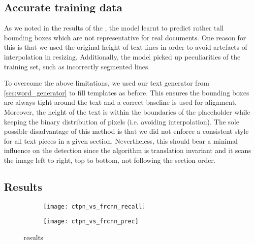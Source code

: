 



	\subsection{Accurate training data}
		As we noted in the results of the \FRCNN{}, the model learnt to predict rather tall bounding boxes which are not representative for real documents. One reason for this is that we used the original height of text lines in order to avoid artefacts of interpolation in resizing. Additionally, the model picked up peculiarities of the training set, such as incorrectly segmented lines.

		To overcome the above limitations, we used our text generator from \autoref{sec:word_generator} to fill templates as before. This ensures the bounding boxes are always tight around the text and a correct baseline is used for alignment. Moreover, the height of the text is within the boundaries of the placeholder while keeping the binary distribution of pixels (i.e. avoiding interpolation). The sole possible disadvantage of this method is that we did not enforce a consistent style for all text pieces in a given section. Nevertheless, this should bear a minimal influence on the detection since the algorithm is translation invariant and it scans the image left to right, top to bottom, not following the section order.


	\subsection{Results}
		\begin{figure}[ht]
			\begin{subfigure}{.49\linewidth}
				\texttt{[image: ctpn\_vs\_frcnn\_recall]}
				\caption{}
				\label{fig:ctpn_vs_frcnn_recall}
			\end{subfigure}
			\begin{subfigure}{.49\linewidth}
				\texttt{[image: ctpn\_vs\_frcnn\_prec]}
				\caption{}
				\label{fig:ctpn_vs_frcnn_prec}
			\end{subfigure}
			\caption{\CTPN{} results}
			\label{fig:ctpn_results}
		\end{figure}



